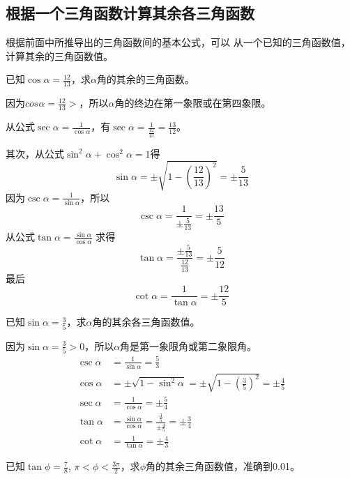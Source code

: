 \subsection{根据一个三角函数计算其余各三角函数}
根据前面中所推导出的三角函数间的基本公式，可以
从一个已知的三角函数值，计算其余的三角函数值。

\begin{example}
已知$\cos\alpha=\frac{12}{13}$，求$\alpha$角的其余的三角函数。
\end{example}

\begin{solution}
因为$cos\alpha=\frac{12}{13}>$，所以$\alpha$角的终边在第一象限或在第四象限。

从公式$\sec\alpha=\frac{1}{\cos\alpha}$，有$\sec\alpha=\frac{1}{\frac{12}{13}}=\frac{13}{12}$。

其次，从公式$\sin^2\alpha+\cos^2\alpha=1$得
\[\sin\alpha=\pm\sqrt{1-\left(\frac{12}{13}\right)^2}=\pm\frac{5}{13}\]
因为$\csc\alpha=\frac{1}{\sin\alpha}$，所以
\[\csc\alpha=\frac{1}{\pm\frac{5}{13}}=\pm\frac{13}{5}\]
从公式$\tan\alpha=\frac{\sin\alpha}{\cos\alpha}$
求得
\[\tan\alpha=\frac{\pm\frac{5}{13}}{\frac{12}{13}}=\pm\frac{5}{12}\]
最后
\[\cot\alpha=\frac{1}{\tan\alpha}=\pm\frac{12}{5}\]
\end{solution}


\begin{example}
    已知$\sin\alpha=\frac{3}{5}$，求$\alpha$角的其余各三角函数值。
\end{example}
    
\begin{solution}
    因为$\sin\alpha=\frac{3}{5}>0$，所以$\alpha$角是第一象限角或第二象限角。
\[\begin{split}
    \csc\alpha&=\frac{1}{\sin\alpha}=\frac{5}{3}\\
    \cos\alpha&=\pm\sqrt{1-\sin^2\alpha}=\pm\sqrt{1-\left(\frac{3}{5}\right)^2}=\pm\frac{4}{5}\\
    \sec\alpha&=\frac{1}{\cos\alpha}=\pm\frac{5}{4}\\
    \tan\alpha&=\frac{\sin\alpha}{\cos\alpha}=\frac{\frac{3}{5}}{\pm\frac{4}{5}}=\pm\frac{3}{4}\\
    \cot\alpha&=\frac{1}{\tan\alpha}=\pm\frac{4}{3}
\end{split}\]
\end{solution}

\begin{example}
已知$\tan\phi=\frac{7}{8}$, $\pi<\phi<\frac{3\pi}{2}$，求$\phi$角的其余三角函数值，准确到0.01。
\end{example}

